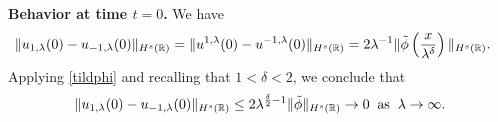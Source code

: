 %
\textbf{Behavior at time $t=0$.}  We have
%
%
%
%
\begin{equation*}
\begin{split}
\|u_{1,\lambda}(0) - u_{-1,\lambda}(0) \|_{H^s(\mathbb{R})} & = \|u^{1,\lambda}(0) 
- u^{-1,\lambda}(0) \|_{H^s(\mathbb{R})}
= 2 \lambda^{-1} \| \tilde{\phi}\left( \frac{x}{\lambda^\delta}
\right) \|_{H^s(\mathbb{R})}.
\label{apple}
\end{split}
\end{equation*}
%
%
%
%
Applying \eqref{tildphi} and recalling that $1<\delta<2$, we conclude that
%
%
\begin{equation}
\begin{split}
\|u_{1,\lambda}(0) - u_{-1,\lambda}(0) \|_{H^s(\mathbb{R})} \le 2
\lambda^{\frac{\delta}{2}-1} \|\tilde{\phi} \|_{H^s(\mathbb{R})} \to 0
\; \; \text{as} \; \; \lambda \to \infty.
\label{apple70}
\end{split}
\end{equation}
%
%
%
%
%  
%


